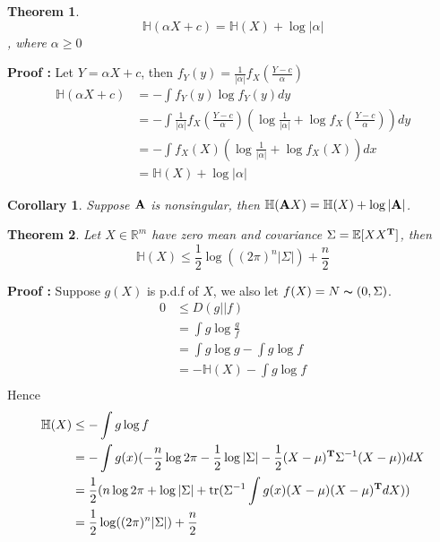 \documentclass[11pt]{article}
\def\A{{\bf A}}
\def\T{{\bf T}}
\def\tr{\mathrm{tr}}
\newtheorem{theorem}{Theorem}[section]
\newtheorem{corollary}{Corollary}[section]
\begin{document}
\begin{theorem}
$$\mathbb{H}(\alpha X+c)=\mathbb{H}(X)+\log|\alpha|$$, where $\alpha\geq0$
\end{theorem}
{\bf Proof : } Let $Y=\alpha X+c$, then $f_{Y}(y)=\frac{1}{|\alpha|}f_{X}(\frac{Y-c}{\alpha})$
\[
\begin{split}
\mathbb{H}(\alpha X+c) &= -\int f_{Y}(y)\log f_{Y}(y)dy \\
                       &= -\int \frac{1}{|\alpha|}f_{X}(\frac{Y-c}{\alpha})(\log \frac{1}{|\alpha|}+\log f_{X}(\frac{Y-c}{\alpha}))dy \\
                       &= -\int f_{X}(X)(\log \frac{1}{|\alpha|}+\log f_{X}(X))dx \\
                       &=\mathbb{H}(X)+\log|\alpha|
\end{split}
\]
\begin{corollary}
Suppose $\A$ is nonsingular, then $\mathbb{H}(\A X)=\mathbb{H}(X)+\log|\A|$.
\end{corollary}
\begin{theorem}
Let $X \in \mathbb{R}^{m}$ have zero mean and covariance $\Sigma=\mathbb{E}[XX^{\T}]$, then
$$\mathbb{H}(X)\leq\frac{1}{2}\log((2\pi)^{n}|\Sigma|)+\frac{n}{2}$$
\end{theorem}
{\bf Proof :} Suppose $g(X)$ is p.d.f of $X$, we also let $f(X)=N\thicksim(0,\Sigma)$.
\[
\begin{split}
0 &\leq D(g||f) \\
  &= \int g\log \frac{g}{f} \\
  &= \int g\log g -\int g\log f \\
  &=-\mathbb{H}(X)-\int g\log f\\
\end{split}
\]
Hence
\[
\begin{split}
\mathbb{H}(X) &\leq -\int g\log f \\
              &= -\int g(x)(-\frac{n}{2}\log 2\pi - \frac{1}{2}\log |\Sigma|-\frac{1}{2}(X-\mu)^{\T}\Sigma^{-1}(X-\mu))dX \\
              &=\frac{1}{2}(n\log 2\pi +\log |\Sigma|+\tr(\Sigma^{-1}\int g(x)(X-\mu)(X-\mu)^{\T}dX)) \\
              &=\frac{1}{2}\log((2\pi)^{n}|\Sigma|)+\frac{n}{2}
\end{split}
\]
\end{document}
